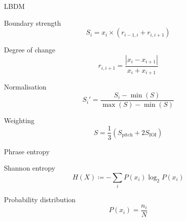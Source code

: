 \documentclass[handout]{beamer}
\begin{document}
\begin{frame}{LBDM}
    \begin{block}{Boundary strength}
        \begin{equation*}
            S_i=x_i\times (r_{i-1, i} + r_{i, i+1})
        \end{equation*}
    \end{block}
    \begin{block}{Degree of change}
        \begin{equation*}
            r_{i, i+1}=\frac{|x_{i}-x_{i+1}|}{x_{i}+x_{i+1}}
        \end{equation*}
    \end{block}
    \begin{block}{Normalisation}
        \begin{equation*}
            S_i'=\frac{S_i-\min(S)}{\max(S)-\min(S)}
        \end{equation*}
    \end{block}
    \begin{block}{Weighting}
        \begin{equation*}
            S=\frac{1}{3}\left( S_\mathrm{pitch} + 2 S_\mathrm{IOI} \right)
        \end{equation*}
    \end{block}
\end{frame}

\begin{frame}{Phrase entropy}
    \begin{block}{Shannon entropy}
        \begin{equation*}
            H(X)\coloneq-\sum_i P(x_i)\log_2 P(x_i)
        \end{equation*}
    \end{block}
    \begin{block}{Probability distribution}
        \begin{equation*}
            P(x_i)=\frac{n_i}{N}
        \end{equation*}
    \end{block}
\end{frame}
\end{document}
